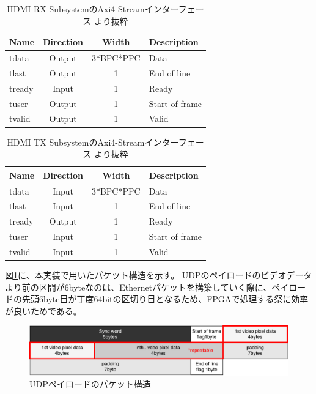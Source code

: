 \begin{table}[htbp]
  \caption{HDMI RX SubsystemのAxi4-Streamインターフェース \cite{xilinx-pg236}より抜粋}
  \label{tb:pg236-vout-axi4-stream}
  \begin{center}
  \begin{tabular}{l|c|c|l}
    \hline
    Name   & Direction & Width     & Description \\\hline\hline
    tdata  & Output    & 3*BPC*PPC & Data \\\hline
    tlast  & Output    & 1         & End of line \\\hline
    tready & Input     & 1         & Ready \\\hline
    tuser  & Output    & 1         & Start of frame \\\hline
    tvalid & Output    & 1         & Valid \\\hline
  \end{tabular}\end{center}
\end{table}

\begin{table}[htbp]
  \caption{HDMI TX SubsystemのAxi4-Streamインターフェース \cite{xilinx-pg235}より抜粋}
  \label{tb:pg235-vin-axi4-stream}
  \begin{center}
  \begin{tabular}{l|c|c|l}
    \hline
    Name   & Direction & Width     & Description \\\hline\hline
    tdata  & Input     & 3*BPC*PPC & Data \\\hline
    tlast  & Input     & 1         & End of line \\\hline
    tready & Output    & 1         & Ready \\\hline
    tuser  & Input     & 1         & Start of frame \\\hline
    tvalid & Input     & 1         & Valid \\\hline
  \end{tabular}\end{center}
\end{table}

図\ref{fig:fpga-video-packet}に、本実装で用いたパケット構造を示す。
UDPのペイロードのビデオデータより前の区間が6byteなのは、Ethernetパケットを構築していく際に、ペイロードの先頭6byte目が丁度64bitの区切り目となるため、FPGAで処理する祭に効率が良いためである。

\begin{figure}[htbp]
  \begin{center}
    \includegraphics[bb=0 0 643 122,width=15.5cm]{img/fpga-video-packet.pdf}
  \end{center}
  \caption{UDPペイロードのパケット構造}
  \label{fig:fpga-video-packet}
\end{figure}

